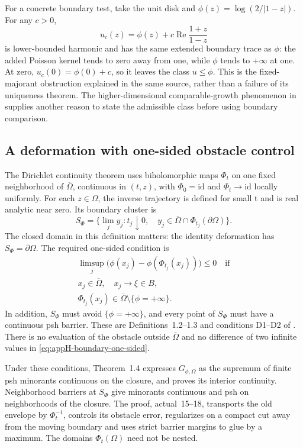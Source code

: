 For a concrete boundary test, take the unit disk and
\(\phi(z)=\log(2/|1-z|)\). For any \(c>0\),
\[
 u_c(z)=\phi(z)+c\operatorname{Re}\frac{1+z}{1-z}
\]
is lower-bounded harmonic and has the same extended boundary trace as
\(\phi\): the added Poisson kernel tends to zero away from one, while
\(\phi\) tends to \(+\infty\) at one. At zero, \(u_c(0)=\phi(0)+c\),
so it leaves the class \(u\leq\phi\). This is the fixed-majorant
obstruction explained in the same source, rather than a failure of its
uniqueness theorem. The higher-dimensional comparable-growth phenomenon
in  supplies another reason
to state the admissible class before using boundary comparison.

\subsection{A deformation with one-sided obstacle control}
\label{sec:appH-boundary-neighborhood-deformation}

The Dirichlet continuity theorem uses biholomorphic maps \(\Phi_t\)
on one fixed neighborhood of \(\overline\Omega\), continuous in
\((t,z)\), with \(\Phi_0=\mathrm{id}\) and \(\Phi_t\to\mathrm{id}\)
locally uniformly. For each \(z\in\Omega\), the inverse trajectory is
defined for small t and is real analytic near zero. Its boundary cluster is
\[
 S_\Phi=\{\lim_j y_j:t_j\downarrow0,\quad
       y_j\in\overline\Omega\cap\Phi_{t_j}(\partial\Omega)\}.
\]
The closed domain in this definition matters: the identity deformation
has \(S_\Phi=\partial\Omega\). The required one-sided condition is
\[
 \begin{gathered}
 \limsup_j\bigl(\phi(x_j)-\phi(\Phi_{t_j}(x_j))\bigr)\leq0
 \quad\text{if}\\
 x_j\in\overline\Omega,\quad x_j\to\xi\in B,\\
 \Phi_{t_j}(x_j)\in\overline\Omega\setminus\{\phi=+\infty\}.
 \end{gathered}
 \tag{H.17}\label{eq:appH-boundary-one-sided}
\]
In addition, \(S_\Phi\) must avoid \(\{\phi=+\infty\}\), and every
point of \(S_\Phi\) must have a continuous psh barrier. These are
Definitions~1.2--1.3 and conditions D1--D2 of
\cite[actual pp.~4--5]{DaoNguyen26UnboundedDirichletV1}.
There is no evaluation of the obstacle outside \(\overline\Omega\)
and no difference of two infinite values in
\eqref{eq:appH-boundary-one-sided}.

Under these conditions, Theorem~1.4 expresses \(G_{\phi,\Omega}\)
as the supremum of finite psh minorants continuous on the closure,
and proves its interior continuity. Neighborhood barriers at
\(S_\Phi\) give minorants continuous and psh on neighborhoods of the
closure. The proof, actual~15--18, transports the old envelope by
\(\Phi_t^{-1}\), controls its obstacle error, regularizes on a compact
cut away from the moving boundary and uses strict barrier margins to
glue by a maximum. The domains \(\Phi_t(\Omega)\) need not be nested.

